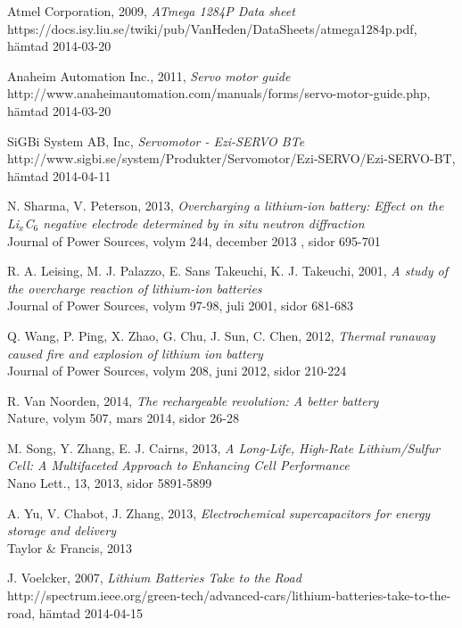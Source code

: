 \documentclass[a4paper,12pt]{article}
\begin{document}
\begin{thebibliography}{9}
 Atmel Corporation, 2009, \emph{ATmega 1284P Data sheet}
\\https://docs.isy.liu.se/twiki/pub/VanHeden/DataSheets/atmega1284p.pdf, hämtad 2014-03-20

 Anaheim Automation Inc., 2011, \emph{Servo motor guide}
\\ http://www.anaheimautomation.com/manuals/forms/servo-motor-guide.php, hämtad 2014-03-20

 SiGBi System AB, Inc, \emph{Servomotor - Ezi-SERVO BTe}\\
http://www.sigbi.se/system/Produkter/Servomotor/Ezi-SERVO/Ezi-SERVO-BT, hämtad 2014-04-11

 N. Sharma, V. Peterson, 2013, \emph{Overcharging a lithium-ion battery: Effect on the Li$_{x}$C$_{6}$ negative electrode determined by in situ neutron diffraction}
\\ Journal of Power Sources, volym 244, december 2013 , sidor 695-701

 R. A. Leising, M. J. Palazzo, E. Sans Takeuchi, K. J. Takeuchi, 2001, \emph{A study of the overcharge reaction of lithium-ion batteries}
\\ Journal of Power Sources, volym 97-98, juli 2001, sidor 681-683

 Q. Wang, P. Ping, X. Zhao, G. Chu, J. Sun, C. Chen, 2012, \emph{Thermal runaway caused fire and explosion of lithium ion battery}
\\ Journal of Power Sources, volym 208, juni 2012, sidor 210-224

 R. Van Noorden, 2014, \emph{The rechargeable revolution: A better battery} \\ Nature, volym 507, mars 2014, sidor 26-28

 M. Song, Y. Zhang, E. J. Cairns, 2013, \emph{A Long-Life, High-Rate Lithium/Sulfur Cell: A Multifaceted Approach to Enhancing Cell Performance} \\ Nano Lett., 13, 2013, sidor 5891-5899

 A. Yu, V. Chabot, J. Zhang, 2013, \emph{Electrochemical supercapacitors for energy storage and delivery} \\ Taylor \& Francis, 2013

 J. Voelcker, 2007, \emph{Lithium Batteries Take to the Road} \\
http://spectrum.ieee.org/green-tech/advanced-cars/lithium-batteries-take-to-the-road, hämtad 2014-04-15

\end{thebibliography}
\end{document}
